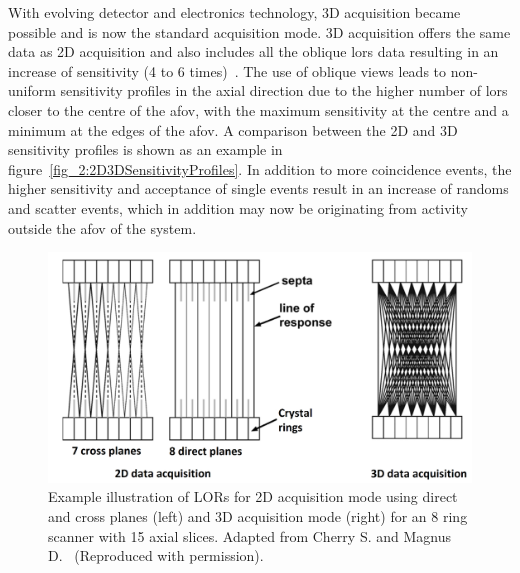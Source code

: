With evolving detector and electronics technology, 3D acquisition became possible and is now the standard acquisition mode. 3D acquisition offers the same data as 2D acquisition and also includes all the oblique \glspl{lor} data resulting in an increase of sensitivity (4 to 6 times)~\cite{Fahey2002}. The use of oblique views leads to non-uniform sensitivity profiles in the axial direction due to the higher number of \glspl{lor} closer to the centre of the \gls{afov}, with the maximum sensitivity at the centre and a minimum at the edges of the \gls{afov}. A comparison between the 2D and 3D sensitivity profiles is shown as an example in figure~\ref{fig_2:2D3DSensitivityProfiles}.
In addition to more coincidence events, the higher sensitivity and acceptance of single events result in an increase of randoms and scatter events, which in addition may now be originating from activity outside the \gls{afov} of the system. 
%
\begin{figure} [ht!]
\centering
\includegraphics[scale=0.40,angle=0]{2_Theory_Methods/figures/Phelps_2D_3D_Acquisition.pdf}
\caption[Example illustration of LORs for 2D acquisition mode using direct and cross planes (left) and 3D  acquisition mode (right) for an 8 ring scanner with 15 axial slices.]{Example illustration of LORs for 2D acquisition mode using direct and cross planes (left) and 3D  acquisition mode (right) for an 8 ring scanner with 15 axial slices. Adapted from Cherry S. and Magnus D.~\cite{cherry2004pet} (Reproduced with permission).}
\label{fig_2:2D3D}
\end{figure} 

